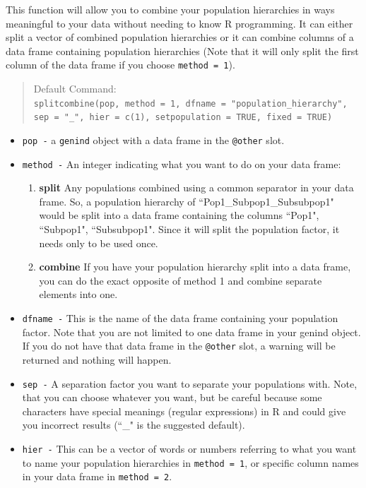 \documentclass[letterpaper]{article}
\newcommand{\tab}{\hspace*{1em}}
\begin{document}
\tab\tab This function will allow you to combine your population hierarchies in ways meaningful to your data without needing to know R programming. It can either split a vector of combined population hierarchies or it can combine columns of a data frame containing population hierarchies (Note that it will only split the first column of the data frame if you choose \texttt{method = 1}).
\begin{quote}
Default Command:\\
\texttt{splitcombine(pop, method = 1, dfname = "population\_hierarchy", sep = "\_", hier = c(1), setpopulation = TRUE, fixed = TRUE)}
\end{quote}
\begin{itemize}
  \item \texttt{pop -} a \texttt{genind} object with a data frame in the \texttt{@other} slot.
  \item \texttt{method -} An integer indicating what you want to do on your data frame:
  \begin{enumerate}
    \item \textbf{split} Any populations combined using a common separator in your data frame. So, a population hierarchy of ``Pop1\_Subpop1\_Subsubpop1" would be split into a data frame containing the columns ``Pop1", ``Subpop1", ``Subsubpop1". Since it will split the population factor, it needs only to be used once. 
    \item \textbf{combine} If you have your population hierarchy split into a data frame, you can do the exact opposite of method 1 and combine separate elements into one.
  \end{enumerate}
  \item \texttt{dfname -} This is the name of the data frame containing your population factor. Note that you are not limited to one data frame in your genind object. If you do not have that data frame in the \texttt{@other} slot, a warning will be returned and nothing will happen.
  \item \texttt{sep -} A separation factor you want to separate your populations with. Note, that you can choose whatever you want, but be careful because some characters have special meanings (regular expressions) in R and could give you incorrect results (``\_" is the suggested default).
  \item \texttt{hier -} This can be a vector of words or numbers referring to what you want to name your population hierarchies in \texttt{method = 1}, or specific column names in your data frame in \texttt{method = 2}. 

\end{itemize}
\end{document}
